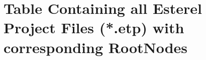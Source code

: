 \documentclass{template/openetcs_article}
\begin{document}
 

 


\author{DLR, Braunschweig}


\mainmatter 
\section{Table Containing all Esterel Project Files (*.etp) with corresponding RootNodes} 
\cleardoublepage


\end{document}
